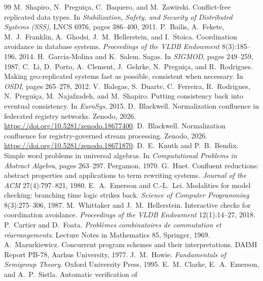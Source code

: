 \begin{thebibliography}{99}
 M.~Shapiro, N.~Pregui\c{c}a, C.~Baquero, and M.~Zawirski. Conflict-free
  replicated data types. In \emph{Stabilization, Safety, and Security of Distributed Systems (SSS)},
  LNCS 6976, pages 386--400, 2011.
 P.~Bailis, A.~Fekete, M.~J.~Franklin, A.~Ghodsi, J.~M.~Hellerstein, and
  I.~Stoica. Coordination avoidance in database systems. \emph{Proceedings of the VLDB Endowment}
  8(3):185--196, 2014.
 H.~Garcia-Molina and K.~Salem. Sagas. In \emph{SIGMOD}, pages 249--259, 1987.
 C.~Li, D.~Porto, A.~Clement, J.~Gehrke, N.~Pregui\c{c}a, and R.~Rodrigues. Making
  geo-replicated systems fast as possible, consistent when necessary. In \emph{OSDI}, pages 265--278,
  2012.
 V.~Balegas, S.~Duarte, C.~Ferreira, R.~Rodrigues, N.~Pregui\c{c}a, M.~Najafzadeh,
  and M.~Shapiro. Putting consistency back into eventual consistency. In \emph{EuroSys}, 2015.
 D.~Blackwell. Normalization confluence in federated registry networks.
  Zenodo, 2026. \url{https://doi.org/10.5281/zenodo.18677400}.
 D.~Blackwell. Normalization confluence for registry-governed stream
  processing. Zenodo, 2026. \url{https://doi.org/10.5281/zenodo.18671870}.
 D.~E.~Knuth and P.~B.~Bendix. Simple word problems in universal algebras.
  In \emph{Computational Problems in Abstract Algebra}, pages 263--297. Pergamon, 1970.
 G.~Huet. Confluent reductions: abstract properties and applications to term
  rewriting systems. \emph{Journal of the ACM} 27(4):797--821, 1980.
 E.~A.~Emerson and C.-L.~Lei. Modalities for model checking: branching time
  logic strikes back. \emph{Science of Computer Programming} 8(3):275--306, 1987.
 M.~Whittaker and J.~M.~Hellerstein. Interactive checks for coordination
  avoidance. \emph{Proceedings of the VLDB Endowment} 12(1):14--27, 2018.
 P.~Cartier and D.~Foata. \emph{Probl\`emes combinatoires de commutation et
  r\'earrangements}. Lecture Notes in Mathematics 85, Springer, 1969.
 A.~Mazurkiewicz. Concurrent program schemes and their interpretations.
  DAIMI Report PB-78, Aarhus University, 1977.
 J.~M.~Howie. \emph{Fundamentals of Semigroup Theory}. Oxford University Press,
  1995.
 E.~M.~Clarke, E.~A.~Emerson, and A.~P.~Sistla. Automatic verification of

\end{thebibliography}
